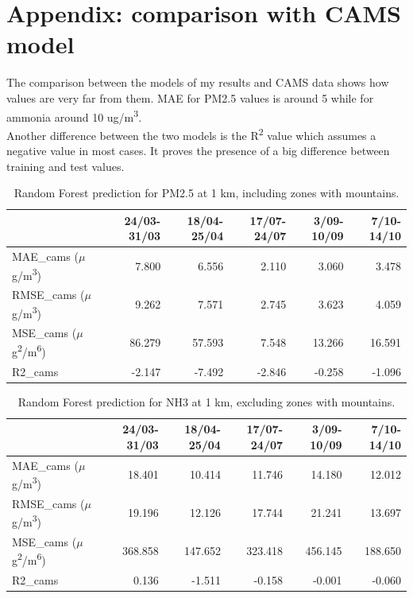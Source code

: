 \chapter{Appendix: comparison with CAMS model  }
\label{chap:appendixCAMS}
The comparison between the models of my results and CAMS data shows how values are very far from them. MAE for PM2.5 values is around 5 while for ammonia around 10 ug/m\textsuperscript{3}. \\
Another difference between the two models is the R\textsuperscript{2} value which assumes a negative value in most cases. It proves the presence of a big difference between training and test values. 
\begin{table}[H]
\begin{tabular}{lrrrrr}
\toprule
  &  24/03-31/03 &  18/04-25/04 &  17/07-24/07 &  3/09-10/09 &  7/10-14/10 \\
\midrule
  MAE\_cams ($\mu$g/m\textsuperscript{3})&        7.800 &        6.556 &        2.110 &       3.060 &       3.478 \\
  RMSE\_cams ($\mu$g/m\textsuperscript{3})&        9.262 &        7.571 &        2.745 &       3.623 &       4.059 \\
   MSE\_cams ($\mu$g\textsuperscript{2}/m\textsuperscript{6})&       86.279 &       57.593 &        7.548 &      13.266 &      16.591 \\
    R2\_cams &       -2.147 &       -7.492 &       -2.846 &      -0.258 &      -1.096 \\
\bottomrule
\end{tabular}
\caption{Random Forest prediction for PM2.5 at 1 km, including zones with mountains.}
\label{tab:cams1}
\end{table}
\begin{table}[H]
\begin{tabular}{lrrrrr}
\toprule
  &  24/03-31/03 &  18/04-25/04 &  17/07-24/07 &  3/09-10/09 &  7/10-14/10 \\
\midrule
   MAE\_cams ($\mu$g/m\textsuperscript{3})&       18.401 &       10.414 &       11.746 &      14.180 &      12.012 \\
  RMSE\_cams ($\mu$g/m\textsuperscript{3})&       19.196 &       12.126 &       17.744 &      21.241 &      13.697 \\
   MSE\_cams ($\mu$g\textsuperscript{2}/m\textsuperscript{6})&      368.858 &      147.652 &      323.418 &     456.145 &     188.650 \\
    R2\_cams &        0.136 &       -1.511 &       -0.158 &      -0.001 &      -0.060 \\
\bottomrule
\end{tabular}
\caption{Random Forest prediction for NH3 at 1 km, excluding zones with mountains.}
\label{tab:cams2}
\end{table}
